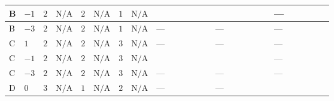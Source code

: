 \documentclass[8pt]{article}
\begin{document}
\begin{landscape}
\begin{longtable}{@{}llcccccc >{\raggedright\arraybackslash}p{0.21\linewidth} >{\raggedright\arraybackslash}p{0.21\linewidth} >{\raggedright\arraybackslash}p{0.21\linewidth}@{}}
B & $-1$ & $2$ & $\text{N/A}$ & $2$ & $\text{N/A}$ & $1$ & $\text{N/A}$ & \scriptsize\adjustbox{max width=\linewidth}{$\begin{gathered} +{\lambda_{H H^\dagger S_1^\dagger S_2^\dagger}^{\rm Cross}} (4 \left({\lambda_{H H^\dagger S_1^\dagger S_2^\dagger}^{\rm Cross}}\right)^{*}+3 \left({\lambda_{11}}\right)^{*}+2 \left({\lambda_{X_{17}}^{(1)}}\right)^{*})\end{gathered}$} & \scriptsize\adjustbox{max width=\linewidth}{$\begin{gathered} +{\lambda_{X_{17}}^{(1)}} (2 \left({\lambda_{H H^\dagger S_1^\dagger S_2^\dagger}^{\rm Cross}}\right)^{*}-3 \left({\lambda_{11}}\right)^{*}+4 \left({\lambda_{X_{17}}^{(1)}}\right)^{*})\end{gathered}$} & --- \\
\midrule
B & $-3$ & $2$ & $\text{N/A}$ & $2$ & $\text{N/A}$ & $1$ & $\text{N/A}$ & --- & --- & --- \\
\midrule
C & $1$ & $2$ & $\text{N/A}$ & $2$ & $\text{N/A}$ & $3$ & $\text{N/A}$ & --- & --- & --- \\
\midrule
C & $-1$ & $2$ & $\text{N/A}$ & $2$ & $\text{N/A}$ & $3$ & $\text{N/A}$ & \scriptsize\adjustbox{max width=\linewidth}{$\begin{gathered} +{\lambda_{H H^\dagger S_1^\dagger S_2^\dagger}^{\rm Cross}} (4 \left({\lambda_{H H^\dagger S_1^\dagger S_2^\dagger}^{\rm Cross}}\right)^{*}+3 \left({\lambda_{11}}\right)^{*}+2 \left({\lambda_{X_{17}}^{(1)}}\right)^{*})\end{gathered}$} & \scriptsize\adjustbox{max width=\linewidth}{$\begin{gathered} +{\lambda_{X_{17}}^{(1)}} (2 \left({\lambda_{H H^\dagger S_1^\dagger S_2^\dagger}^{\rm Cross}}\right)^{*}-3 \left({\lambda_{11}}\right)^{*}+4 \left({\lambda_{X_{17}}^{(1)}}\right)^{*})\end{gathered}$} & --- \\
\midrule
C & $-3$ & $2$ & $\text{N/A}$ & $2$ & $\text{N/A}$ & $3$ & $\text{N/A}$ & --- & --- & --- \\
\midrule
D & $0$ & $3$ & $\text{N/A}$ & $1$ & $\text{N/A}$ & $2$ & $\text{N/A}$ & --- & --- & \scriptsize\adjustbox{max width=\linewidth}{$\begin{gathered} {\lambda_{HS_1}^{(1)}} (6 \operatorname{Tr}\!\left({Y_d}\,\left({Y_d}\right)^{\dagger}\right)+2 \operatorname{Tr}\!\left({Y_e}\,\left({Y_e}\right)^{\dagger}\right)+6 \operatorname{Tr}\!\left({Y_u}\,\left({Y_u}\right)^{\dagger}\right)+4 {\lambda_{S_1}^{(A)}})\end{gathered}$} \\

\end{longtable}
\end{landscape}
\end{document}
